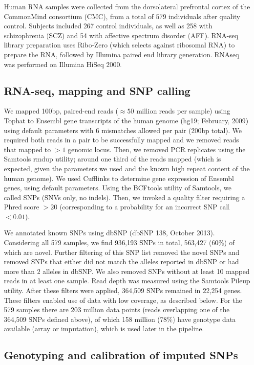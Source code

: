 \documentclass[letterpaper]{article}
\begin{document}
Human RNA samples were collected from the dorsolateral prefrontal cortex of
the CommonMind consortium (CMC), from a total of \(579\) individuals after
quality control. Subjects included 267 control individuals, as well as 258
with schizophrenia (SCZ) and 54 with affective spectrum disorder (AFF).
RNA-seq library preparation uses Ribo-Zero (which selects against ribosomal
RNA) to prepare the RNA, followed by Illumina paired end library generation.
RNAseq was performed on Illumina HiSeq 2000.

\subsection{RNA-seq, mapping and SNP calling}

We mapped 100bp, paired-end reads (\(\approx50\) million reads per sample) using Tophat
to Ensembl gene transcripts of the human genome (hg19; February, 2009) using
default parameters with 6 mismatches allowed per pair (200bp total). We
required both reads in a pair to be successfully mapped and we removed reads
that mapped to \(>1\) genomic locus. Then, we removed PCR replicates using the
Samtools rmdup utility; around one third of the reads mapped (which is
expected, given the parameters we used and the known high repeat content of
the human genome). We used Cufflinks to determine gene expression of Ensembl
genes, using default parameters. Using the BCFtools utility of Samtools, we
called SNPs (SNVs only, no indels). Then, we invoked a quality filter
requiring a Phred score \(>20\) (corresponding to a probability for an
incorrect SNP call \(<0.01\)).

We annotated known SNPs using dbSNP (dbSNP 138, October 2013). Considering all
579 samples, we find 936,193 SNPs in total, 563,427 (60\%) of which are novel.
Further filtering of this SNP list removed the novel SNPs and removed SNPs
that either did not match the alleles reported in dbSNP or had more than 2
alleles in dbSNP. We also removed SNPs without at least 10 mapped reads in at
least one sample. Read depth was measured using the Samtools Pileup utility.
After these filters were applied, 364,509 SNPs remained in 22,254 genes. These
filters enabled use of data with low coverage, as described below. For the 579
samples there are 203 million data points (reads overlapping one of the
364,509 SNPs defined above), of which 158 million (78\%) have genotype data
available (array or imputation), which is used later in the pipeline.

\subsection{Genotyping and calibration of imputed SNPs}
\end{document}
